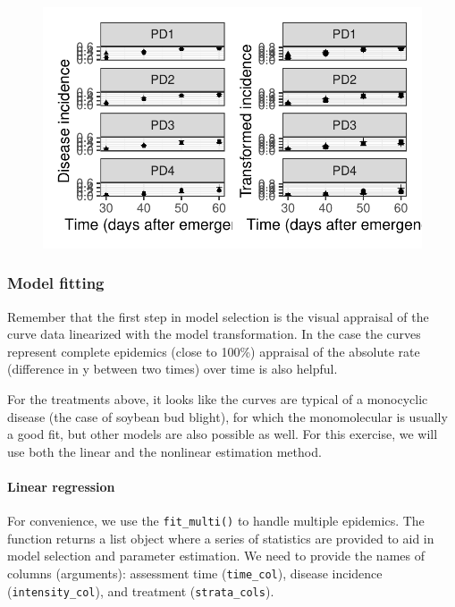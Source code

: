 \documentclass[
  letterpaper,
  DIV=11,
  numbers=noendperiod]{scrreprt}
\let\oldparagraph\paragraph
\renewcommand{\paragraph}[1]{\oldparagraph{#1}\mbox{}}
\begin{document}
\begin{figure}[H]

{\centering \includegraphics{./temporal-fitting_files/figure-pdf/unnamed-chunk-34-1.pdf}

}

\end{figure}

\hypertarget{model-fitting-1}{%
\subsubsection{Model fitting}\label{model-fitting-1}}

Remember that the first step in model selection is the visual appraisal
of the curve data linearized with the model transformation. In the case
the curves represent complete epidemics (close to 100\%) appraisal of
the absolute rate (difference in y between two times) over time is also
helpful.

For the treatments above, it looks like the curves are typical of a
monocyclic disease (the case of soybean bud blight), for which the
monomolecular is usually a good fit, but other models are also possible
as well. For this exercise, we will use both the linear and the
nonlinear estimation method.

\hypertarget{linear-regression}{%
\paragraph{Linear regression}\label{linear-regression}}

For convenience, we use the \texttt{fit\_multi()} to handle multiple
epidemics. The function returns a list object where a series of
statistics are provided to aid in model selection and parameter
estimation. We need to provide the names of columns (arguments):
assessment time (\texttt{time\_col}), disease incidence
(\texttt{intensity\_col}), and treatment (\texttt{strata\_cols}).
\end{document}
